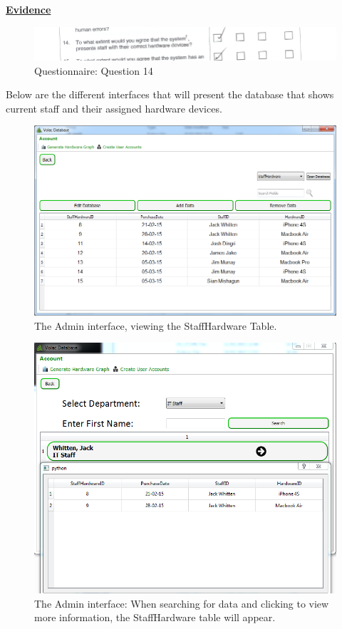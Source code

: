 \underline{\textbf{Evidence}}

\begin{figure}[H]
    \includegraphics[width=\textwidth]{./Evaluation/EvaluationQuestionnaire/14.png}
    \caption{Questionnaire: Question 14} 
\end{figure}

Below are the different interfaces that will present the database that shows current staff and their assigned hardware devices.

\begin{figure}[H]
    \includegraphics[width=\textwidth]{./Evaluation/Images/Database1.png}
    \caption{The Admin interface, viewing the StaffHardware Table.} \label{fig:db1}
\end{figure}

\begin{figure}[H]
    \includegraphics[width=\textwidth]{./Evaluation/Images/database3.png}
    \caption{The Admin interface: When searching for data and clicking to view more information, the StaffHardware table will appear.} \label{fig:db2}
\end{figure}

